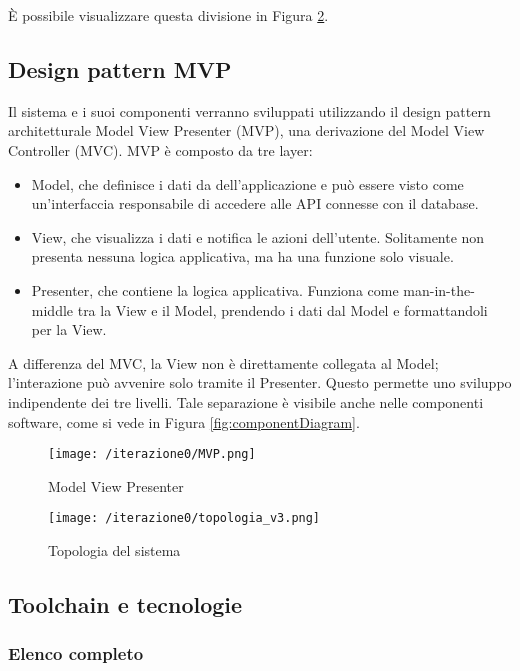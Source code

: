 È possibile visualizzare questa divisione in Figura \ref{fig:topologia}.

\subsection{Design pattern MVP}
Il sistema e i suoi componenti verranno sviluppati utilizzando il design pattern architetturale Model View Presenter (MVP), una derivazione del Model View Controller (MVC). MVP è composto da tre layer: \begin{itemize}
    \item Model, che definisce i dati da dell'applicazione e può essere visto come un'interfaccia responsabile di accedere alle API connesse con il database. 
    \item View, che visualizza i dati e notifica le azioni dell’utente. Solitamente non presenta nessuna logica applicativa, ma ha una funzione solo visuale. 
    \item Presenter, che contiene la logica applicativa. Funziona come man-in-the-middle tra la View e il Model, prendendo i dati dal Model e formattandoli per la View.
\end{itemize}
A differenza del MVC, la View non è direttamente collegata al Model; l'interazione può avvenire solo tramite il Presenter. Questo permette uno sviluppo indipendente dei tre livelli. Tale separazione è visibile anche nelle componenti software, come si vede in Figura \ref{fig:componentDiagram}.

\begin{figure}[htbp]
    \texttt{[image: /iterazione0/MVP.png]}
    \centering
    \caption{Model View Presenter}\label{fig:MVP}
\end{figure}
\begin{figure}[htbp]
    \texttt{[image: /iterazione0/topologia\_v3.png]}
    \centering
    \caption{Topologia del sistema}\label{fig:topologia}
\end{figure}

\clearpage
\subsection{Toolchain e tecnologie}

\subsubsection{Elenco completo}

